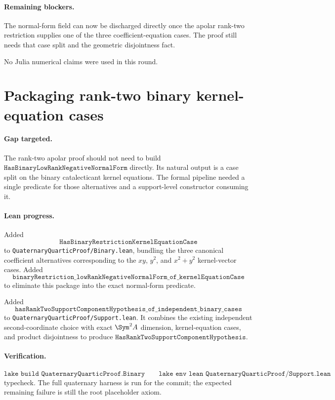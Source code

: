 \documentclass[11pt]{article}
\begin{document}
\paragraph{Remaining blockers.}
The normal-form field can now be discharged directly once the apolar
rank-two restriction supplies one of the three coefficient-equation cases.
The proof still needs that case split and the geometric disjointness fact.

No Julia numerical claims were used in this round.

\section*{Packaging rank-two binary kernel-equation cases}

\paragraph{Gap targeted.}
The rank-two apolar proof should not need to build
\(\texttt{HasBinaryLowRankNegativeNormalForm}\) directly.  Its natural output
is a case split on the binary catalecticant kernel equations.  The formal
pipeline needed a single predicate for those alternatives and a support-level
constructor consuming it.

\paragraph{Lean progress.}
Added
\[
\texttt{HasBinaryRestrictionKernelEquationCase}
\]
to \texttt{QuaternaryQuarticProof/Binary.lean}, bundling the three canonical
coefficient alternatives corresponding to the \(xy\), \(y^2\), and
\(x^2+y^2\) kernel-vector cases.  Added
\[
\texttt{binaryRestriction\_lowRankNegativeNormalForm\_of\_kernelEquationCase}
\]
to eliminate this package into the exact normal-form predicate.

Added
\[
\texttt{hasRankTwoSupportComponentHypothesis\_of\_independent\_binary\_cases}
\]
to \texttt{QuaternaryQuarticProof/Support.lean}.  It combines the existing
independent second-coordinate choice with exact \(\Sym^2A\) dimension,
kernel-equation cases, and product disjointness to produce
\(\texttt{HasRankTwoSupportComponentHypothesis}\).

\paragraph{Verification.}
\[
\texttt{lake build QuaternaryQuarticProof.Binary}
\qquad
\texttt{lake env lean QuaternaryQuarticProof/Support.lean}
\]
typecheck.  The full quaternary harness is run for the commit; the expected
remaining failure is still the root placeholder axiom.
\end{document}
